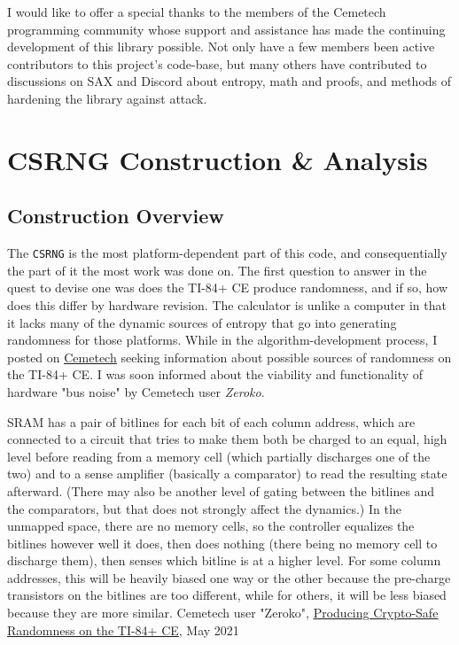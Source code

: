 \documentclass[titlepage]{article}
\begin{document}
		I would like to offer a special thanks to the members of the Cemetech programming community whose support and assistance has made the continuing development of this library possible. Not only have a few members been active contributors to this project's code-base, but many others have contributed to discussions on SAX and Discord about entropy, math and proofs, and methods of hardening the library against attack.
	\newpage %
	
	\section{CSRNG Construction \& Analysis}
	\label{ssec:csprng}
		\subsection{Construction Overview}
			The \texttt{CSRNG} is the most platform-dependent part of this code, and consequentially the part of it the most work was done on. The first question to answer in the quest to devise one was does the TI-84+ CE produce randomness, and if so, how does this differ by hardware revision. The calculator is unlike a computer in that it lacks many of the dynamic sources of entropy that go into generating randomness for those platforms. While in the algorithm-development process, I posted on \underline{\href{https://cemetech.net}{Cemetech}} seeking information about possible sources of randomness on the TI-84+ CE. I was soon informed about the viability and functionality of hardware "bus noise" by Cemetech user \textit{Zeroko}.
			\begin{newquote}
				SRAM has a pair of bitlines for each bit of each column address, which are connected to a circuit that tries to make them both be charged to an equal, high level before reading from a memory cell (which partially discharges one of the two) and to a sense amplifier (basically a comparator) to read the resulting state afterward. (There may also be another level of gating between the bitlines and the comparators, but that does not strongly affect the dynamics.) In the unmapped space, there are no memory cells, so the controller equalizes the bitlines however well it does, then does nothing (there being no memory cell to discharge them), then senses which bitline is at a higher level. For some column addresses, this will be heavily biased one way or the other because the pre-charge transistors on the bitlines are too different, while for others, it will be less biased because they are more similar. 
				\tcblower
				Cemetech user "Zeroko", \underline{\href{https://www.cemetech.net/forum/viewtopic.php?p=293079}{Producing Crypto-Safe Randomness on the TI-84+ CE}}, May 2021
			\end{newquote}
\end{document}
